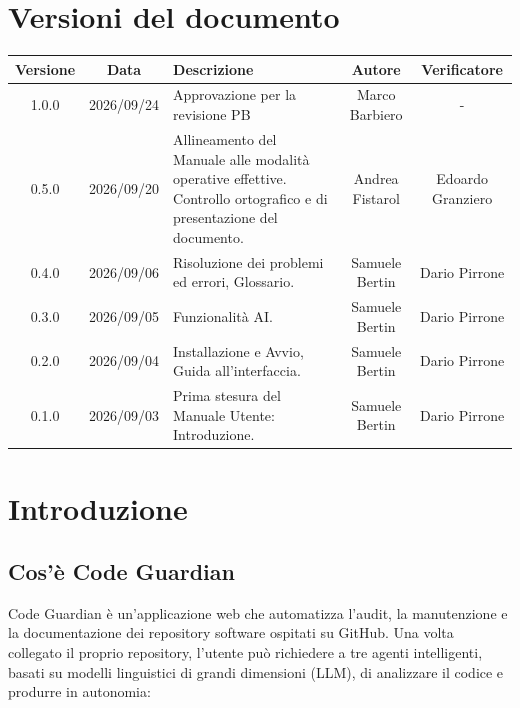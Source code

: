 \documentclass[11pt,a4paper]{article}
\begin{document}
\section*{Versioni del documento}
\renewcommand{\arraystretch}{1.3}
\begin{tabularx}{\textwidth}{|c|c|X|c|c|}
\hline
\textbf{Versione} & \textbf{Data} & \textbf{Descrizione} & \textbf{Autore} & \textbf{Verificatore}\\
\hline

1.0.0 & 2026/09/24 & Approvazione per la revisione PB & Marco Barbiero & - \\ \hline
0.5.0 & 2026/09/20 & Allineamento del Manuale alle modalità operative effettive. Controllo ortografico e di presentazione del documento. & Andrea Fistarol & Edoardo Granziero \\ \hline
0.4.0 & 2026/09/06 & Risoluzione dei problemi ed errori, Glossario. & Samuele Bertin & Dario Pirrone \\ \hline
0.3.0 & 2026/09/05 & Funzionalità AI. & Samuele Bertin & Dario Pirrone \\ \hline
0.2.0 & 2026/09/04 & Installazione e Avvio, Guida all'interfaccia. & Samuele Bertin & Dario Pirrone \\ \hline
0.1.0 & 2026/09/03 & Prima stesura del Manuale Utente: Introduzione. & Samuele Bertin & Dario Pirrone \\
\hline
\end{tabularx}

\vspace{1cm}

\newpage
\tableofcontents

\newpage
\section{Introduzione}

\subsection{Cos'è Code Guardian}

Code Guardian è un'applicazione web che automatizza l'audit, la manutenzione e la
documentazione dei repository software ospitati su GitHub. Una volta collegato il proprio
repository, l'utente può richiedere a tre agenti intelligenti, basati su modelli linguistici
di grandi dimensioni (LLM), di analizzare il codice e produrre in autonomia:
\end{document}
